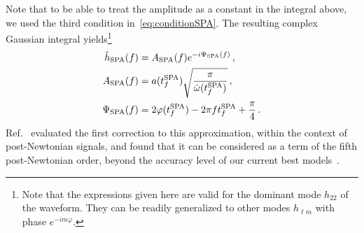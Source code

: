 \documentclass[aps,showpacs,twocolumn,
prd,superscriptaddress,nofootinbib]{revtex4-1}
\newcommand{\tfSPA}{t_{f}^{\rm SPA}}
\begin{document}
Note that to be able to treat the amplitude as a constant in the integral above, we used the third condition in~\eqref{eq:conditionSPA}. The resulting complex Gaussian integral yields\footnote{Note that the expressions given here are valid for the dominant mode $h_{22}$ of the waveform. They can be readily generalized to other modes $h_{\ell m}$ with phase $e^{-im\varphi}$.}
\begin{subequations}
\begin{align}
	\tilde{h}_{\rm SPA}(f) &= A_{\rm SPA}(f) e^{-i\Psi_{\rm SPA}(f)} \,, \\
	A_{\rm SPA}(f) &= a(\tfSPA) \sqrt{\frac{\pi}{\dot{\omega}(\tfSPA)}} \,, \\
	\Psi_{\rm SPA}(f) &= 2\varphi(\tfSPA) - 2\pi f \tfSPA + \frac{\pi}{4} \,. \label{eq:PsiSPA}
\end{align}
\end{subequations}
Ref.~\cite{Droz+99} evaluated the first correction to this approximation, within the context of post-Newtonian signals, and found that it can be considered as a term of the fifth post-Newtonian order, beyond the accuracy level of our current best models~\cite{BlanchetLiving}.
\end{document}
